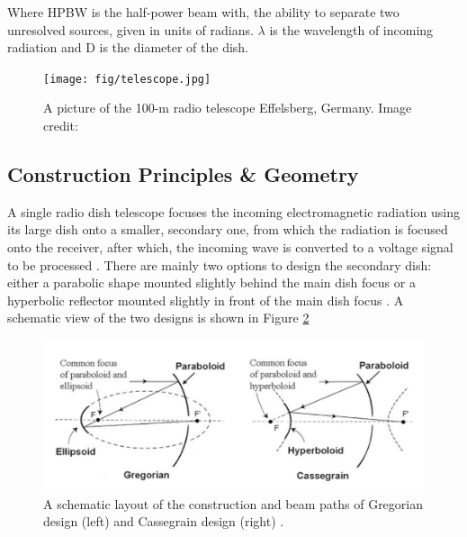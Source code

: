 \documentclass[12pt]{article}
\begin{document}
Where HPBW is the half-power beam with, the ability to separate two unresolved sources, given in units of radians. $\lambda$ is the wavelength of incoming radiation and D is the diameter of the dish.

\begin{figure}[H]
\centering
\texttt{[image: fig/telescope.jpg]}
\caption{A picture of the 100-m radio telescope Effelsberg, Germany. Image credit: \cite{effelsberg}}
\label{fig2.1}
\end{figure} 

    \subsection{Construction Principles \& Geometry}
    A single radio dish telescope focuses the incoming electromagnetic radiation using its large dish onto a smaller, secondary one, from which the radiation is focused onto the receiver, after which, the incoming wave is converted to a voltage signal to be processed \cite{essential}. 
    There are mainly two options to design the secondary dish: either a parabolic shape mounted slightly behind the main dish focus or a hyperbolic reflector mounted slightly in front of the main dish focus \cite{klein}. A schematic view of the two designs is shown in Figure \ref{fig2.2} 

\begin{figure}[H]
\centering
\includegraphics[scale=0.5]{fig/design.jpg}
\caption{A schematic layout of the construction and beam paths of Gregorian design (left) and Cassegrain design (right) \cite{design}.}
\label{fig2.2}
\end{figure} 

    
\end{document}
